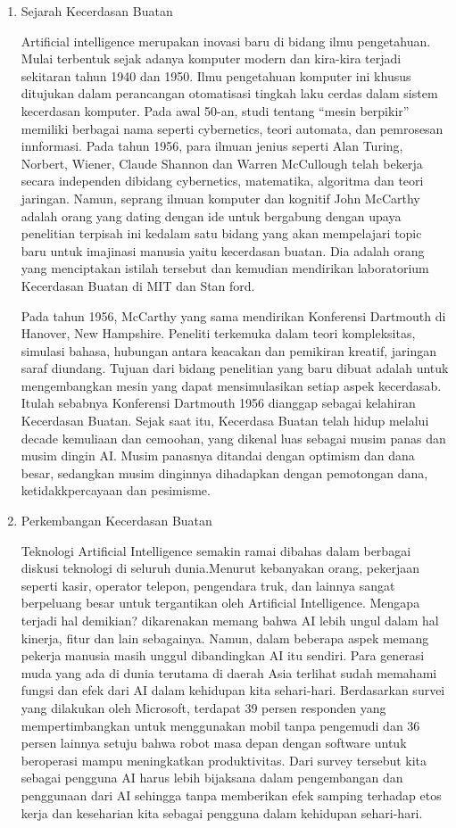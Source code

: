 \begin{enumerate}
    \item {Sejarah Kecerdasan Buatan}
    \par Artificial intelligence merupakan inovasi baru di bidang ilmu pengetahuan. Mulai terbentuk sejak adanya komputer modern dan kira-kira terjadi sekitaran tahun 1940 dan 1950. Ilmu pengetahuan komputer ini khusus ditujukan dalam perancangan otomatisasi tingkah laku cerdas dalam sistem kecerdasan komputer. Pada awal 50-an, studi tentang “mesin berpikir” memiliki berbagai nama seperti cybernetics, teori automata, dan pemrosesan innformasi. Pada tahun 1956, para ilmuan jenius seperti Alan Turing, Norbert, Wiener, Claude Shannon dan Warren McCullough telah bekerja secara independen dibidang cybernetics, matematika, algoritma dan teori jaringan. Namun, seprang ilmuan komputer dan kognitif John McCarthy adalah orang yang dating dengan ide untuk bergabung dengan upaya penelitian terpisah ini kedalam satu bidang yang akan mempelajari topic baru untuk imajinasi manusia yaitu kecerdasan buatan. Dia adalah orang yang menciptakan istilah tersebut dan kemudian mendirikan laboratorium Kecerdasan Buatan di MIT dan Stan ford.

    Pada tahun 1956, McCarthy yang sama mendirikan Konferensi Dartmouth di Hanover, New Hampshire. Peneliti terkemuka dalam teori kompleksitas, simulasi bahasa, hubungan antara keacakan dan pemikiran kreatif, jaringan saraf diundang. Tujuan dari bidang penelitian yang baru dibuat adalah untuk mengembangkan mesin yang dapat mensimulasikan setiap aspek kecerdasab. Itulah sebabnya Konferensi Dartmouth 1956 dianggap sebagai kelahiran Kecerdasan Buatan. Sejak saat itu, Kecerdasa Buatan telah hidup melalui decade kemuliaan dan cemoohan, yang dikenal luas sebagai musim panas dan musim dingin AI. Musim panasnya ditandai dengan optimism dan dana besar, sedangkan musim dinginnya dihadapkan dengan pemotongan dana, ketidakkpercayaan dan pesimisme.

    \item{Perkembangan Kecerdasan Buatan}
    \par Teknologi Artificial Intelligence semakin ramai dibahas dalam berbagai diskusi teknologi di seluruh dunia.Menurut kebanyakan orang, pekerjaan seperti kasir, operator telepon, pengendara truk, dan lainnya sangat berpeluang besar untuk tergantikan oleh Artificial Intelligence. Mengapa terjadi hal demikian? dikarenakan memang bahwa AI lebih ungul dalam hal kinerja, fitur dan lain sebagainya. Namun, dalam beberapa aspek memang pekerja manusia masih unggul dibandingkan AI itu sendiri. Para generasi muda yang ada di dunia terutama di daerah Asia terlihat sudah memahami fungsi dan efek dari AI dalam kehidupan kita sehari-hari. Berdasarkan survei yang dilakukan oleh Microsoft, terdapat 39 persen responden yang mempertimbangkan untuk menggunakan mobil tanpa pengemudi dan 36 persen lainnya setuju bahwa robot masa depan dengan software untuk beroperasi mampu meningkatkan produktivitas. Dari survey tersebut kita sebagai pengguna AI harus lebih bijaksana dalam pengembangan dan penggunaan dari AI sehingga tanpa memberikan efek samping terhadap etos kerja dan keseharian kita sebagai pengguna dalam kehidupan sehari-hari.


\end{enumerate}
